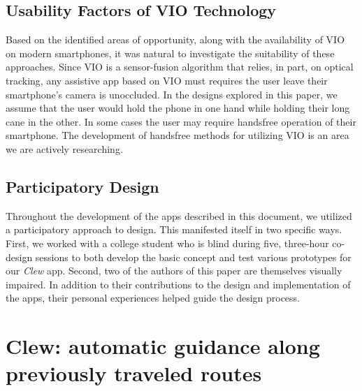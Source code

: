 \documentclass[chi_draft]{sigchi}
\begin{document}
\subsection{Usability Factors of VIO Technology}
Based on the identified areas of opportunity, along with the availability of VIO on modern smartphones, it was natural to investigate the suitability of these approaches.  Since VIO is a sensor-fusion algorithm that relies, in part, on optical tracking, any assistive app based on VIO must requires the user leave their smartphone's camera is unoccluded.  In the designs explored in this paper, we assume that the user would hold the phone in one hand while holding their long cane in the other.  In some cases the user may require handsfree operation of their smartphone. The development of handsfree methods for utilizing VIO is an area we are actively researching.

\subsection{Participatory Design}
Throughout the development of the apps described in this document, we utilized a participatory approach to design.  This manifested itself in two specific ways.  First, we worked with a college student who is blind during five, three-hour co-design sessions to both develop the basic concept and test various prototypes for our \emph{Clew} app.   Second, two of the authors of this paper are themselves visually impaired.  In addition to their contributions to the design and implementation of the apps, their personal experiences helped guide the design process.

\section{Clew: automatic guidance along previously traveled routes}
\end{document}
